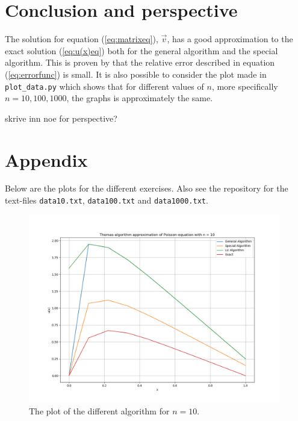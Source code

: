 \documentclass{article}
\begin{document}
\vspace{1cm}

\section{Conclusion and perspective}

  The solution for equation (\ref{eq:matrixeq}), $\vec{v}$, has a good approximation to the exact solution (\ref{eq:u(x)eq}) both for the general algorithm and the special algorithm. This is proven by that the relative error described in equation (\ref{eq:errorfunc}) is small. It is also possible to consider the plot made in \texttt{plot\_data.py} which shows that for different values of $n$, more specifically $n = 10, 100, 1000$, the graphs is approximately the same.

  {\large skrive inn noe for perspective? }


\vspace{1cm}

\section{Appendix}

Below are the plots for the different exercises. Also see the repository for the text-files \texttt{data10.txt}, \texttt{data100.txt} and \texttt{data1000.txt}.

\begin{figure}[ht]
	\centering
	\includegraphics[width = 11cm]{program/data10.png}
	\caption{The plot of the different algorithm for $n = 10$. }
	\label{fig:data10png}
\end{figure}
\end{document}
